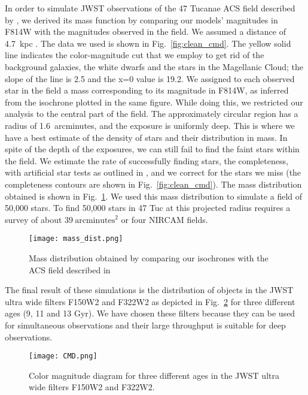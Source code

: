 \documentclass[useAMS,usenatbib]{mnras}
\begin{document}
In order to simulate JWST observations of the 47 Tucanae ACS field described by \citet{1538-3881-143-1-11}, we derived its mass function by comparing our models' magnitudes in F814W with the magnitudes observed in the field. We assumed a distance of 4.7~kpc \citep{2012AJ....143...50W}. The data we used is shown in Fig.~\ref{fig:clean_cmd}. The yellow solid line indicates the color-magnitude cut that we employ to get rid of the background galaxies, the white dwarfs and the stars in the Magellanic Cloud; the slope of the line is 2.5 and the x=0 value is 19.2. We assigned to each observed star in the field a mass corresponding to its magnitude in F814W, as inferred from the isochrone plotted in the same figure. While doing this, we restricted our analysis to the central part of the field.  The approximately circular region has a radius of 1.6~arcminutes, and the exposure is uniformly deep.  This is where we have a best estimate of the density of stars and their distribution in mass.  In spite of the depth of the exposures, we can still fail to find the faint stars within the field.  We estimate the rate of successfully finding stars, the completeness, with artificial star tests as outlined in \citet{1538-3881-143-1-11}, and we correct for the stars we miss (the completeness contours are shown in Fig.~\ref{fig:clean_cmd}). The mass distribution obtained is shown in Fig.~\ref{fig:mass_dist}. We used this mass distribution to simulate a field of 50,000 stars. To find 50,000 stars in 47 Tuc at this projected radius requires a survey of about $39~\mathrm{arcminutes}^2$ or four NIRCAM fields.

\begin{figure}
\texttt{[image: mass\_dist.png]}
\caption{Mass distribution obtained by comparing our isochrones with the ACS field described in \citep{1538-3881-143-1-11}}
\label{fig:mass_dist}
\end{figure}

The final result of these simulations is the distribution of objects in the JWST ultra wide filters F150W2 and F322W2 as depicted in Fig.~\ref{fig:cmd} for three different ages (9, 11 and 13 Gyr). We have chosen these filters because they can be used for simultaneous observations and their large throughput is suitable for deep observations.

\begin{figure}
\texttt{[image: CMD.png]}
\caption{Color magnitude diagram for three different ages in the JWST ultra wide filters F150W2 and F322W2.}
\label{fig:cmd}
\end{figure}

\label{lastpage}
\end{document}
